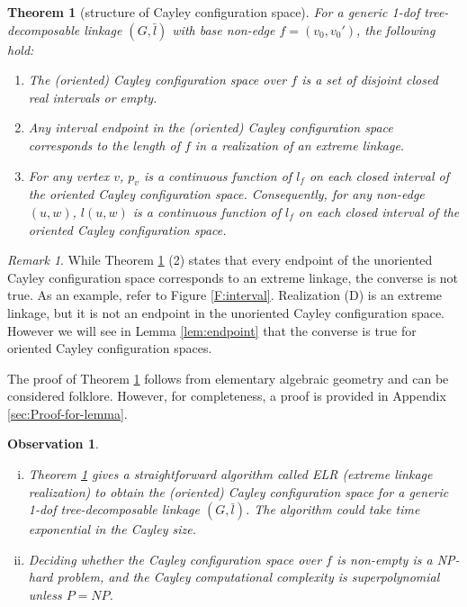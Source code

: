 \documentclass[secthm,amsthm,english]{article}
\newtheorem{theorem}{Theorem}
\newtheorem{observation}{Observation}
\theoremstyle{definition}
\theoremstyle{remark}
\newtheorem{remark}{Remark}
\begin{document}
\begin{theorem}[structure of Cayley configuration space]\label{lem:algebraic}
 For a generic 1-dof tree-decomposable linkage $(G,\bar{l})$ with base non-edge $f=(v_{0},v_{0}')$, 
the following hold:

 \begin{enumerate}
 	\item The (oriented) Cayley configuration space over $f$ is a set of disjoint closed real intervals or empty. 
 	
 	\item Any interval endpoint in the (oriented) Cayley configuration space corresponds to the length of $f$ in a realization of an extreme linkage. 
 	\item For any vertex $v$, $p_v$ is a continuous
 	 	function of $l_f$ on each closed interval of the oriented Cayley configuration space.
Consequently, for any  non-edge $(u,w)$, $l(u,w)$ is a continuous function of $l_f$ on each closed interval of the oriented Cayley configuration space.\end{enumerate}
 
\end{theorem}

\begin{remark} \label{rmk:endpoint}
While Theorem \ref{lem:algebraic} (2) states that every endpoint of the unoriented Cayley configuration space
corresponds to an extreme linkage, 
the converse is not true. 
As an example, refer to Figure \ref{F:interval}. 
Realization (D) is an extreme linkage, 
but it is not an endpoint in the unoriented Cayley configuration space.
However we will see in Lemma \ref{lem:endpoint} that the converse is true for oriented Cayley configuration spaces. 
\end{remark}

The proof of Theorem \ref{lem:algebraic} follows from elementary algebraic geometry and can be considered folklore. 
However, for completeness, a proof is provided in Appendix \ref{sec:Proof-for-lemma}. 

\begin{observation} \label{obs:NP-hard}
\begin{enumerate}[(i)]
\item Theorem \ref{lem:algebraic} gives a straightforward algorithm  called {\emph{ELR (extreme linkage realization)}} 
to obtain the (oriented) Cayley configuration space for a generic 1-dof tree-decomposable linkage $(G, \bar{l})$. 
The algorithm could take time exponential in the Cayley size.

\item Deciding whether the Cayley configuration space over $f$ is non-empty is a NP-hard problem, and
the Cayley computational complexity is superpolynomial unless $P = NP$. 
\end{enumerate}

\end{observation}
\end{document}
